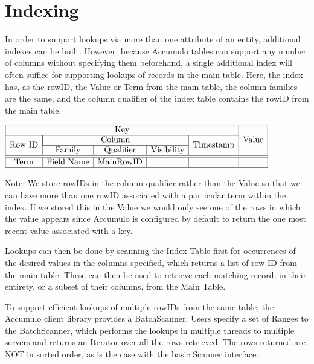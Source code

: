 \section{Indexing}
In order to support lookups via more than one attribute of an entity, additional
indexes can be built. However, because Accumulo tables can support any number of
columns without specifying them beforehand, a single additional index will often
suffice for supporting lookups of records in the main table. Here, the index has, as
the rowID, the Value or Term from the main table, the column families are the same,
and the column qualifier of the index table contains the rowID from the main table.

\begin{center}
$\begin{array}{|c|c|c|c|c|c|} \hline
\multicolumn{5}{|c|}{\mbox{Key}} & \multirow{3}{*}{\mbox{Value}}\\ \cline{1-5}
\multirow{2}{*}{\mbox{Row ID}}& \multicolumn{3}{|c|}{\mbox{Column}} & \multirow{2}{*}{\mbox{Timestamp}} & \\ \cline{2-4}
& \mbox{Family} & \mbox{Qualifier} & \mbox{Visibility} & & \\ \hline \hline
\mbox{Term} & \mbox{Field Name} & \mbox{MainRowID} & & &\\ \hline
\end{array}$
\end{center}

Note: We store rowIDs in the column qualifier rather than the Value so that we can
have more than one rowID associated with a particular term within the index. If we
stored this in the Value we would only see one of the rows in which the value
appears since Accumulo is configured by default to return the one most recent
value associated with a key.

Lookups can then be done by scanning the Index Table first for occurrences of the
desired values in the columns specified, which returns a list of row ID from the main
table. These can then be used to retrieve each matching record, in their entirety, or a
subset of their columns, from the Main Table.

To support efficient lookups of multiple rowIDs from the same table, the Accumulo
client library provides a BatchScanner. Users specify a set of Ranges to the
BatchScanner, which performs the lookups in multiple threads to multiple servers
and returns an Iterator over all the rows retrieved. The rows returned are NOT in
sorted order, as is the case with the basic Scanner interface.

